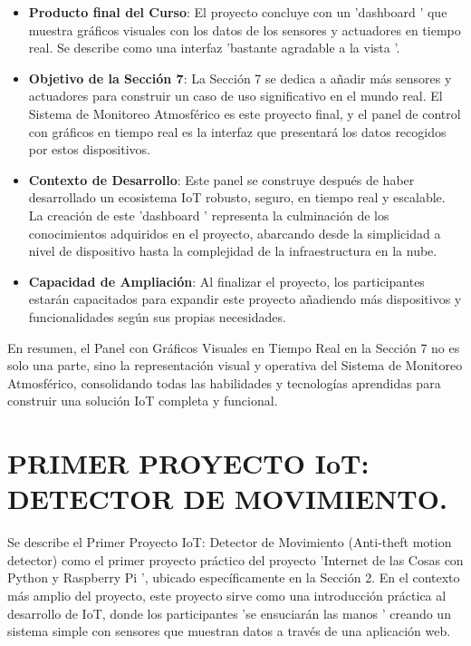 \documentclass{report}
\begin{document}
\begin{itemize}
    \item \textbf{Producto final del Curso}: El proyecto concluye con un  'dashboard ' que muestra gráficos visuales con los datos de los sensores y actuadores 
    en tiempo real. Se describe como una interfaz  'bastante agradable a la vista '.
    \item \textbf{Objetivo de la Sección 7}: La Sección 7 se dedica a añadir más sensores y actuadores para construir un caso de uso significativo en el 
    mundo real. El Sistema de Monitoreo Atmosférico es este proyecto final, y el panel de control con gráficos en tiempo real es la interfaz que presentará 
    los datos recogidos por estos dispositivos.
    \item \textbf{Contexto de Desarrollo}: Este panel se construye después de haber desarrollado un ecosistema IoT robusto, seguro, en tiempo real y escalable. 
    La creación de este  'dashboard ' representa la culminación de los conocimientos adquiridos en el proyecto, abarcando desde la simplicidad a nivel de 
    dispositivo hasta la complejidad de la infraestructura en la nube.
    \item \textbf{Capacidad de Ampliación}: Al finalizar el proyecto, los participantes estarán capacitados para expandir este proyecto añadiendo más 
    dispositivos y funcionalidades según sus propias necesidades.
\end{itemize}
En resumen, el Panel con Gráficos Visuales en Tiempo Real en la Sección 7 no es solo una parte, sino la representación visual y operativa del Sistema de 
Monitoreo Atmosférico, consolidando todas las habilidades y tecnologías aprendidas para construir una solución IoT completa y funcional.

\chapter{PRIMER PROYECTO IoT: DETECTOR DE MOVIMIENTO.}
Se describe el Primer Proyecto IoT: Detector de Movimiento (Anti-theft motion detector) como el primer proyecto práctico del proyecto 
'Internet de las Cosas con Python y Raspberry Pi ', ubicado específicamente en la Sección 2.
En el contexto más amplio del proyecto, este proyecto sirve como una introducción práctica al desarrollo de IoT, donde los participantes  
'se ensuciarán las manos ' creando un sistema simple con sensores que muestran datos a través de una aplicación web.
\end{document}
